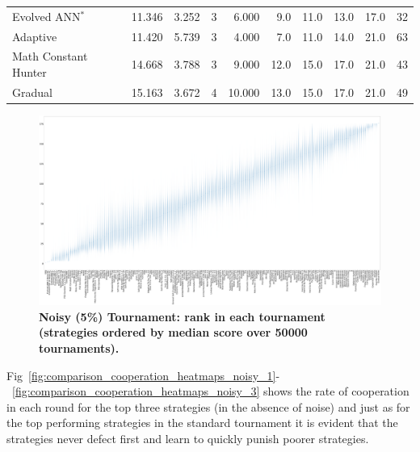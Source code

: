 \documentclass[10pt,letterpaper]{article}
\begin{document}
\begin{table}[!hbtp]
\begin{tabular}{lrrrrrrrrr}
Evolved ANN$^{*}$                &  11.346 &  3.252 &    3 &   6.000 &   9.0 &  11.0 &  13.0 &  17.0 &   32 \\
Adaptive                         &  11.420 &  5.739 &    3 &   4.000 &   7.0 &  11.0 &  14.0 &  21.0 &   63 \\
Math Constant Hunter             &  14.668 &  3.788 &    3 &   9.000 &  12.0 &  15.0 &  17.0 &  21.0 &   43 \\
Gradual                          &  15.163 &  3.672 &    4 &  10.000 &  13.0 &  15.0 &  17.0 &  21.0 &   49 \\
\bottomrule
\end{tabular}
        \label{tbl:noisy_ranks}
\end{table}

\begin{landscape}
    \begin{figure}[!hbtp]
        \centering
        \includegraphics[width=\paperwidth]{noisy_ranks_boxplots.pdf}
        \caption{\bf Noisy (5\%) Tournament: rank in each tournament 
            (strategies ordered by median score over 50000 tournaments).}
        \label{fig:noisy_ranks_boxplot}
    \end{figure}
\end{landscape}

Fig~\ref{fig:comparison_cooperation_heatmaps_noisy_1}-~\ref{fig:comparison_cooperation_heatmaps_noisy_3} shows the rate of
cooperation in each round for the top three strategies (in the absence of noise)
and just as for the top performing strategies in the standard tournament
it is evident that
the strategies never defect first and learn to quickly punish poorer strategies.
\end{document}
